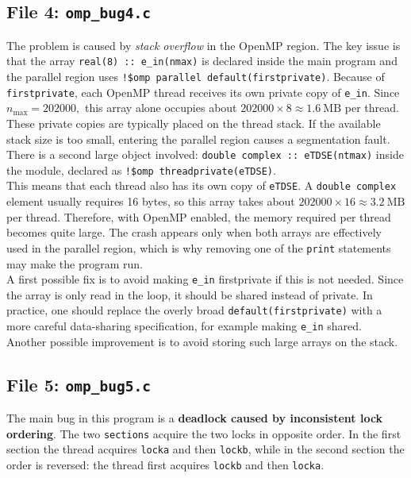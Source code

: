 \documentclass[unicode,10pt,a4paper,oneside,numbers=endperiod,openany]{scrartcl}
\begin{document}
\subsection{File 4: \texttt{omp\_bug4.c}}

The problem is caused by \emph{stack overflow} in the OpenMP region. The key issue is that the array
\texttt{real(8) :: e\_in(nmax)} is declared inside the main program and the parallel region uses
\texttt{!\$omp parallel default(firstprivate)}.
Because of \texttt{firstprivate}, each OpenMP thread receives its own private copy of \texttt{e\_in}. Since $ n_{\max}=202000, $
this array alone occupies about $202000 \times 8 \approx 1.6\ \text{MB}$
per thread. These private copies are typically placed on the thread stack. If the available stack size is too small, entering the parallel region causes a segmentation fault.\\

There is a second large object involved: \texttt{double complex :: eTDSE(ntmax)} inside the module, declared as \texttt{!\$omp threadprivate(eTDSE)}.\\
This means that each thread also has its own copy of \texttt{eTDSE}. A \texttt{double complex} element usually requires 16 bytes, so this array takes about $202000 \times 16 \approx 3.2\ \text{MB}$
per thread. Therefore, with OpenMP enabled, the memory required per thread becomes quite large. The crash appears only when both arrays are effectively used in the parallel region, which is why removing one of the \texttt{print} statements may make the program run.\\

A first possible fix is to avoid making \texttt{e\_in} firstprivate if this is not needed. Since the array is only read in the loop, it should be shared instead of private. In practice, one should replace the overly broad \texttt{default(firstprivate)} with a more careful data-sharing specification, for example making \texttt{e\_in} shared.\\
Another possible improvement is to avoid storing such large arrays on the stack.

\subsection{File 5: \texttt{omp\_bug5.c}}

The main bug in this program is a \textbf{deadlock caused by inconsistent lock ordering}.  
The two \texttt{sections} acquire the two locks in opposite order. In the first section the thread acquires \texttt{locka} and then \texttt{lockb}, while in the second section the order is reversed: the thread first acquires \texttt{lockb} and then \texttt{locka}.
\end{document}
